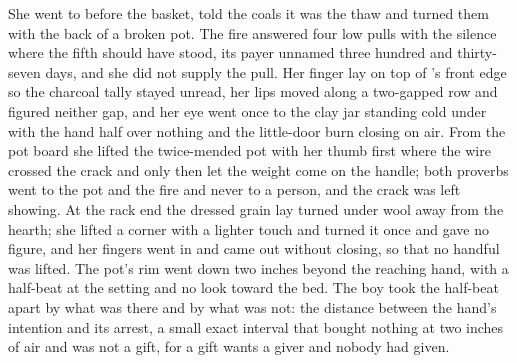 She went to  before the basket, told the coals it was the thaw and turned them with the back of a broken pot. The fire answered four low pulls with the silence where the fifth should have stood, its payer unnamed three hundred and thirty-seven days, and she did not supply the pull. Her finger lay on top of 's front edge so the charcoal tally stayed unread, her lips moved along a two-gapped row and figured neither gap, and her eye went once to the clay jar standing cold under  with the hand half over nothing and the little-door burn closing on air. From the pot board she lifted the twice-mended pot with her thumb first where the wire crossed the crack and only then let the weight come on the handle; both proverbs went to the pot and the fire and never to a person, and the crack was left showing. At the rack end the dressed grain lay turned under wool away from the hearth; she lifted a corner with a lighter touch and turned it once and gave no figure, and her fingers went in and came out without closing, so that no handful was lifted. The pot's rim went down two inches beyond the reaching hand, with a half-beat at the setting and no look toward the bed. The boy took the half-beat apart by what was there and by what was not: the distance between the hand's intention and its arrest, a small exact interval that bought nothing at two inches of air and was not a gift, for a gift wants a giver and nobody had given.

